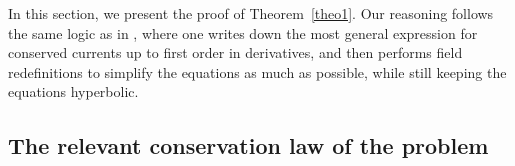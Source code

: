 \documentclass[a4paper, amsfonts, amssymb, amsmath, reprint, showkeys, nofootinbib, twoside, onecolumn,notitlepage]{revtex4-1}
\theoremstyle{definition}
\theoremstyle{theorem}
\begin{document}
In this section, we present the proof of Theorem~\ref{theo1}. Our reasoning follows the same logic as in \cite{Bemfica2019_conformal1,Kovtun2019,BemficaDNDefinitivo2020}, where one writes down the most general expression for conserved currents up to first order in derivatives, and then performs field redefinitions to simplify the equations as much as possible, while still keeping the equations hyperbolic.



\subsection{The relevant conservation law of the problem}\label{heatcurrentsection}

\end{document}
